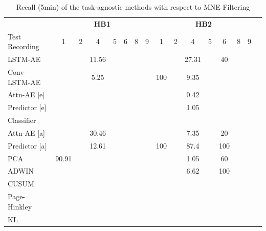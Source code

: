 \begin{table}[btp]
\centering
\caption{Recall (5min) of the task-agnostic methods with respect to MNE Filtering}
\label{tab9}

\begin{tabular}{lccccccccccccccc}
\toprule
          & \multicolumn{7}{c}{\textbf{HB1}} & \multicolumn{7}{c}{\textbf{HB2}} \\
\cmidrule(lr){2-8}\cmidrule(lr){9-15}
Test Recording & 1 & 2 & 4 & 5 & 6 & 8 & 9 & 1 & 2 & 4 & 5 & 6 & 8 & 9 \\
\cmidrule(lr){2-8}\cmidrule(lr){9-15}
LSTM-AE  & &   &  11.56     &       &       &       &       &       &  &   27.31    &   &  40 &       &         \\
Conv-LSTM-AE & &     &   5.25    &  &       &       &       &  100     &       &   9.35    &       &      &       &         \\
\midrule
Attn-AE [e]& &     &       &       &       &       &       &       &       &   0.42    &       &       &       &         \\
Predictor [e]  &&     &       &       &       &       &       &       &       &   1.05    &       &       &       &         \\
Classifier  &&     &       &       &       &       &       &       &       &       &       &       &       &         \\
\midrule
Attn-AE [a] & & & 30.46 &  &  & & & & & 7.35 &  & 20 & & \\
Predictor [a]  & &    & 12.61  &       &       &       &       &  100  &    &   87.4    &    & 100  &       &         \\
\midrule
PCA      & 90.91  &     &       &   &    &    &    &   &    &  1.05 &  & 60 &    &     \\
ADWIN      &   &     &       &     &       &     &       &  &   &    6.62   &   & 100 &   &         \\
CUSUM      &   &     &       &    &       &    &       &  &    &       &   &  &   &         \\
Page-Hinkley      &   &     &       &    &       &    &       &   &   &       &  &  &    &         \\
KL      &   &     &       &    &       &    &       &   &  &       &  &  &    &         \\
\bottomrule
\end{tabular}

\end{table}

